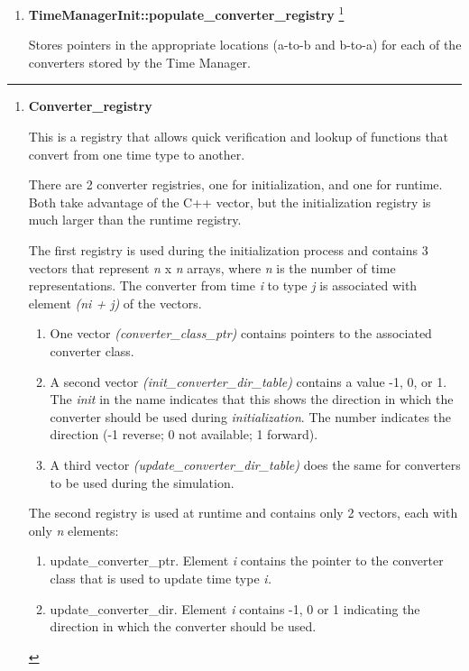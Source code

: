 {\begin{enumerate}
{\begin{enumerate}
{\begin{enumerate}
\item \textbf{TimeManagerInit::populate\_converter\_registry}
{\footnote{{\bf Converter\_registry}\par
This is a registry that allows quick verification and lookup of
functions that convert from one time type to another.\par 
There are
2 converter registries, one for initialization, and one for runtime. 
Both take advantage of the C++ vector, but the initialization registry
is much larger than the runtime registry. \par 
The first
registry is used during the initialization process and contains 3
vectors that represent \textit{n }x \textit{n }arrays, where \textit{n}
is the number of time representations.  The converter from time
\textit{i }to type \textit{j }is associated with element \textit{(ni +
j) }of the vectors.\par 
{\begin{enumerate}
\item One vector \textit{(converter\_class\_ptr)} contains pointers to
the associated converter class.
\item A second vector \textit{(init\_converter\_dir\_table)} contains a
value -1, 0, or 1.  The \textit{init }in the name indicates that this
shows the direction in which the converter should be used during
\textit{initialization}.  The number indicates the direction (-1
reverse; 0 not available; 1 forward).
\item A third vector \textit{(update\_converter\_dir\_table) }does the
same for converters to be used during the simulation.
\end{enumerate}}
\par \par
The second registry is used at runtime and contains only 2
vectors, each with only \textit{n} elements:\par 
{\begin{enumerate}
\item update\_converter\_ptr.  Element\textit{ i }contains the pointer
to the converter class that is used to update time type \textit{i.}
\item update\_converter\_dir.  Element\textit{ i }contains -1, 0 or 1
indicating the direction in which the converter should be used.
\end{enumerate}}
}} \par

Stores pointers in the appropriate locations (a-to-b and b-to-a)
for each of the converters stored by the Time Manager.


\end{enumerate}}
\end{enumerate}}
\end{enumerate}}
